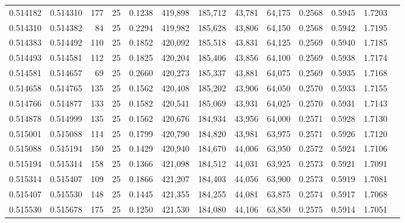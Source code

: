 \begin{tabular}{rrrrrrrrrrrrr}
0.514182 & 0.514310 &   177 &  25 &                                     0.1238 & 419,898 & 185,712 &  43,781 &  64,175 & 0.2568 & 0.5945 & 1.7203 \\
0.514310 & 0.514382 &    84 &  25 &                                     0.2294 & 419,982 & 185,628 &  43,806 &  64,150 & 0.2568 & 0.5942 & 1.7195 \\
0.514383 & 0.514492 &   110 &  25 &                                     0.1852 & 420,092 & 185,518 &  43,831 &  64,125 & 0.2569 & 0.5940 & 1.7185 \\
0.514493 & 0.514581 &   112 &  25 &                                     0.1825 & 420,204 & 185,406 &  43,856 &  64,100 & 0.2569 & 0.5938 & 1.7174 \\
0.514581 & 0.514657 &    69 &  25 &                                     0.2660 & 420,273 & 185,337 &  43,881 &  64,075 & 0.2569 & 0.5935 & 1.7168 \\
0.514658 & 0.514765 &   135 &  25 &                                     0.1562 & 420,408 & 185,202 &  43,906 &  64,050 & 0.2570 & 0.5933 & 1.7155 \\
0.514766 & 0.514877 &   133 &  25 &                                     0.1582 & 420,541 & 185,069 &  43,931 &  64,025 & 0.2570 & 0.5931 & 1.7143 \\
0.514878 & 0.514999 &   135 &  25 &                                     0.1562 & 420,676 & 184,934 &  43,956 &  64,000 & 0.2571 & 0.5928 & 1.7130 \\
0.515001 & 0.515088 &   114 &  25 &                                     0.1799 & 420,790 & 184,820 &  43,981 &  63,975 & 0.2571 & 0.5926 & 1.7120 \\
0.515088 & 0.515194 &   150 &  25 &                                     0.1429 & 420,940 & 184,670 &  44,006 &  63,950 & 0.2572 & 0.5924 & 1.7106 \\
0.515194 & 0.515314 &   158 &  25 &                                     0.1366 & 421,098 & 184,512 &  44,031 &  63,925 & 0.2573 & 0.5921 & 1.7091 \\
0.515314 & 0.515407 &   109 &  25 &                                     0.1866 & 421,207 & 184,403 &  44,056 &  63,900 & 0.2573 & 0.5919 & 1.7081 \\
0.515407 & 0.515530 &   148 &  25 &                                     0.1445 & 421,355 & 184,255 &  44,081 &  63,875 & 0.2574 & 0.5917 & 1.7068 \\
0.515530 & 0.515678 &   175 &  25 &                                     0.1250 & 421,530 & 184,080 &  44,106 &  63,850 & 0.2575 & 0.5914 & 1.7051 \\

\end{tabular}
